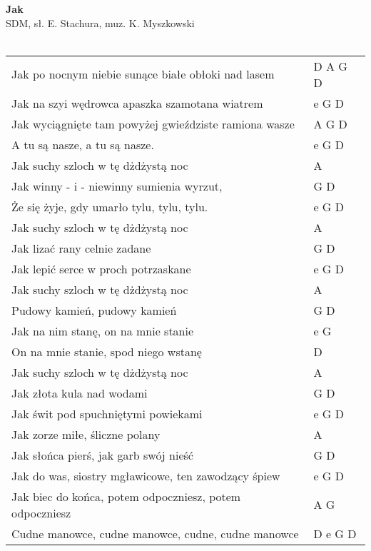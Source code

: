 \documentclass[a5paper]{article}
\begin{document}


\noindent
\fontsize{12pt}{15pt}\selectfont
\textbf{Jak} \\
\fontsize{8pt}{10pt}\selectfont
SDM, sł. E. Stachura, muz. K. Myszkowski \\ \\
\fontsize{10pt}{12pt}\selectfont
{}
\begin{tabular}{@{}p{9.00cm}p{3cm}@{}}
\noindent
Jak po nocnym niebie sunące białe obłoki nad lasem & D A G D \\
Jak na szyi wędrowca apaszka szamotana wiatrem & e G D \\
Jak wyciągnięte tam powyżej gwieździste ramiona wasze & A G D \\
A tu są nasze, a tu są nasze. & e G D \\

Jak suchy szloch w tę dżdżystą noc & A \\
Jak winny - i - niewinny sumienia wyrzut, & G D \\
Że się żyje, gdy umarło tylu, tylu, tylu. & e G D \\
Jak suchy szloch w tę dżdżystą noc & A \\
Jak lizać rany celnie zadane & G D \\
Jak lepić serce w proch potrzaskane & e G D \\
Jak suchy szloch w tę dżdżystą noc & A \\
Pudowy kamień, pudowy kamień & G D \\
Jak na nim stanę, on na mnie stanie & e G \\
On na mnie stanie, spod niego wstanę & D \\
Jak suchy szloch w tę dżdżystą noc & A \\
Jak złota kula nad wodami & G D \\
Jak świt pod spuchniętymi powiekami & e G D \\

Jak zorze miłe, śliczne polany & A \\
Jak słońca pierś, jak garb swój nieść & G D \\
Jak do was, siostry mgławicowe, ten zawodzący śpiew & e G D \\

Jak biec do końca, potem odpoczniesz, potem odpoczniesz & A G \\
Cudne manowce, cudne manowce, cudne, cudne manowce & D e G D
\end{tabular}
\end{document}
